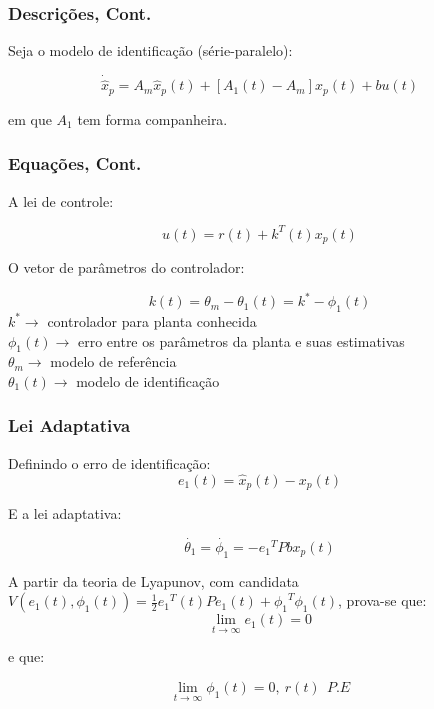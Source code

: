 \documentclass[aspectratio=169]{beamer}
\begin{document}
\begin{frame}
\frametitle{Descrições, Cont.}

Seja o modelo de identificação (série-paralelo):

\begin{equation*}
\dot{\hat{x}}_p = A_m\hat{x}_p(t) + [A_1(t)-A_m]x_p(t) +bu(t)
\end{equation*}

em que $A_1$ tem forma companheira.


\end{frame}

\begin{frame}
\frametitle{Equações, Cont.}

A lei de controle:

\begin{equation*}
u(t) = r(t) +k^T(t)x_p(t)
\end{equation*}

O vetor de parâmetros do controlador:

\begin{equation*}
k(t) = \theta_m - \theta_1(t) = k^* - \phi_1(t)
\end{equation*}
\flushleft
 $k^* \rightarrow$ controlador para planta conhecida \\
 $\phi_1(t) \rightarrow$ erro entre os parâmetros da planta e suas estimativas \\
 $\theta_m \rightarrow$ modelo de referência\\
 $\theta_1(t) \rightarrow$ modelo de identificação  

\end{frame}
\begin{frame}
\frametitle{Lei Adaptativa}

Definindo o erro de identificação:
\begin{equation*}
e_1(t) = \hat{x}_p(t) - x_p(t)
\end{equation*}

E a lei adaptativa:

\begin{equation*}
\dot{\theta_1} = \dot{\phi_1} = -{e_1}^TPbx_p(t)
\end{equation*}

\end{frame}

\begin{frame}

A partir da teoria de Lyapunov, com candidata $V(e_1(t), \phi_1(t))= \frac{1}{2} {e_1}^T(t)Pe_1(t) + {\phi_1}^T\phi_1(t)$, prova-se que:
\begin{equation*}
\lim_{t\rightarrow\infty} e_1(t) = 0
\end{equation*}

e que:

\begin{equation*}
\lim_{t\rightarrow\infty} \phi_1(t)= 0,~r(t)~~P.E
\end{equation*}
\end{frame}
\end{document}
